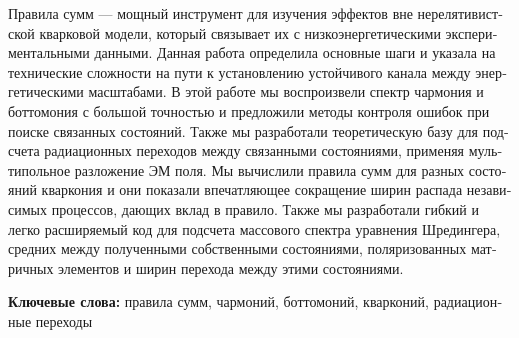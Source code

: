 \begin{titlepage}
\begin{otherlanguage}{russian}
    Правила сумм --- мощный инструмент для изучения эффектов вне нерелятивистской кварковой модели, который связывает их с низкоэнергетическими экспериментальными данными. Данная работа определила основные шаги и указала на технические сложности на пути к установлению устойчивого канала между энергетическими масштабами. В этой работе мы воспроизвели спектр чармония и боттомония с большой точностью и предложили методы контроля ошибок при поиске связанных состояний. Также мы разработали теоретическую базу для подсчета радиационных переходов между связанными состояниями, применяя мультипольное разложение ЭМ поля. Мы вычислили правила сумм для разных состояний кваркония и они показали впечатляющее сокращение ширин распада независимых процессов, дающих вклад в правило. Также мы разработали гибкий и легко расширяемый код для подсчета массового спектра уравнения Шредингера, средних между полученными собственными состояниями, поляризованных матричных элементов и ширин перехода между этими состояниями.

    \noindent \textbf{Ключевые слова:} правила сумм, чармоний, боттомоний, кварконий, радиационные переходы
    \end{otherlanguage}
\end{titlepage}
